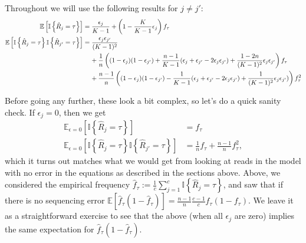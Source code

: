 \documentclass[a4paper,fontsize=9pt,DIV=14]{scrartcl}
\begin{document}
Throughout we will use the following results for $j\ne j'$:
\begin{align}
\mathbb{E}\left[\mathbb{I}\left\{\hat{R}_j = \tau\right\}\right] &= \frac{\epsilon_j}{K-1} + \left(1 - \frac{K}{K-1} \epsilon_j\right)f_\tau \label{eq:first_moment}\\
\mathbb{E}\left[\mathbb{I}\left\{\hat{R}_j = \tau\right\}\mathbb{I}\left\{\hat{R}_{j'} = \tau\right\}\right] &= \frac{\epsilon_j\epsilon_{j'}}{(K-1)^2} \nonumber \\&\hspace{0.4cm}+ \frac{1}{n}\left((1-\epsilon_j)(1-\epsilon_{j'}) + \frac{n-1}{K-1}(\epsilon_j + \epsilon_{j'} - 2\epsilon_j\epsilon_{j'}) + \frac{1-2n}{(K-1)^2}\epsilon_j\epsilon_{j'}\right) f_\tau \label{eq:second_moment} \\&\hspace{0.4cm}+ \frac{n-1}{n}\left((1-\epsilon_j)(1-\epsilon_{j'}) - \frac{1}{K-1}(\epsilon_j + \epsilon_{j'} - 2\epsilon_j\epsilon_{j'}) + \frac{1}{(K-1)^2}\epsilon_j\epsilon_{j'})\right) f_\tau^2 \nonumber
\end{align}

Before going any further, these look a bit complex, so let's do a quick sanity check.  If $\epsilon_j = 0$, then we get
\begin{align*}
\mathbb{E}_{\epsilon=0}\left[\mathbb{I}\left\{\hat{R}_j = \tau\right\}\right] &= f_\tau\\
\mathbb{E}_{\epsilon=0}\left[\mathbb{I}\left\{\hat{R}_j = \tau\right\}\mathbb{I}\left\{\hat{R}_{j'} = \tau\right\}\right] &= \frac{1}{n}f_\tau + \frac{n-1}{n} f_\tau^2,
\end{align*}
which it turns out matches what we would get from looking at reads in the model with no error in the equations as described in the sections above.  Above, we considered the empirical frequency $\widehat{f}_\tau := \frac{1}{c}\sum_{j=1}^c \mathbb{I}\left\{\hat{R}_j = \tau\right\}$, and saw that if there is no sequencing error $\mathbb{E}\left[\widehat{f}_\tau(1-\widehat{f}_\tau)\right] = \frac{n-1}{n}\frac{c-1}{c}f_\tau(1-f_\tau)$.  We leave it as a straightforward exercise to see that the above (when all $\epsilon_j$ are zero) implies the same expectation for $\widehat{f}_\tau(1-\widehat{f}_\tau)$.
\end{document}
